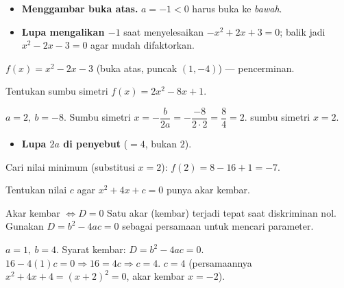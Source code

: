 \begin{jebakan}
\begin{itemize}[leftmargin=*,topsep=2pt]
  \item \textbf{Menggambar buka atas.} $a=-1<0$ harus buka ke \emph{bawah}.
  \item \textbf{Lupa mengalikan $-1$} saat menyelesaikan $-x^2+2x+3=0$; balik jadi
  $x^2-2x-3=0$ agar mudah difaktorkan.
\end{itemize}
\end{jebakan}

\begin{variasi}
$f(x)=x^2-2x-3$ (buka atas, puncak $(1,-4)$) --- pencerminan.
\end{variasi}

\begin{soalbox}{}
Tentukan sumbu simetri $f(x)=2x^2-8x+1$.
\end{soalbox}

\jawab
{} $a=2,\ b=-8$. Sumbu simetri $x=-\dfrac{b}{2a}=-\dfrac{-8}{2\cdot2}
=\dfrac{8}{4}=2$.
\jadi sumbu simetri $x=2$.

\begin{jebakan}
\begin{itemize}[leftmargin=*,topsep=2pt]
  \item \textbf{Lupa $2a$ di penyebut} ($=4$, bukan $2$).
\end{itemize}
\end{jebakan}

\begin{variasi}
Cari nilai minimum (substitusi $x=2$): $f(2)=8-16+1=-7$.
\end{variasi}

\begin{soalbox}{}
Tentukan nilai $c$ agar $x^2+4x+c=0$ punya akar kembar.
\end{soalbox}

\begin{ingat}{Akar kembar $\iff D=0$}
Satu akar (kembar) terjadi tepat saat diskriminan nol. Gunakan $D=b^2-4ac=0$
sebagai persamaan untuk mencari parameter.
\end{ingat}

\jawab
{} $a=1,\ b=4$. Syarat kembar: $D=b^2-4ac=0$.
 $16-4(1)c=0\Rightarrow 16=4c\Rightarrow c=4$.
\jadi $c=4$ (persamaannya $x^2+4x+4=(x+2)^2=0$, akar kembar $x=-2$).

